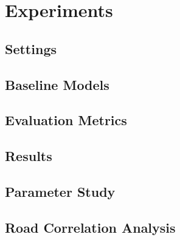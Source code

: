 
\section{Experiments}

\subsection{Settings}

\subsection{Baseline Models}

\subsection{Evaluation Metrics}

\subsection{Results}

\subsection{Parameter Study}

\subsection{Road Correlation Analysis}
